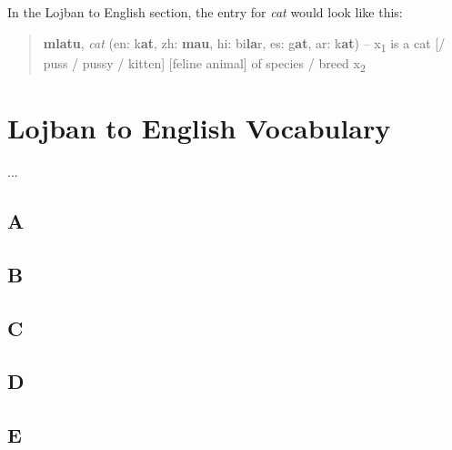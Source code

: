 \documentclass[12pt]{book}
\begin{document}
In the Lojban to English section, the entry for \emph{cat} would look like this:


\begin{quote}
\textbf{mlatu}, \textit{cat} (en: k\textbf{at}, zh: \textbf{mau}, hi: bi\textbf{la}r, es: g\textbf{at}, ar: k\textbf{at}) -- x\textsubscript{1} is a cat [/ puss / pussy / kitten] [feline animal] of species / breed x\textsubscript{2}
\end{quote}


\section{Lojban to English Vocabulary}

...

\subsection{A}

\begin{description}
\item[ ]
\end{description}

\subsection{B}

\begin{description}
\item[ ]
\end{description}

\subsection{C}

\begin{description}
\item[ ]
\end{description}

\subsection{D}

\begin{description}
\item[ ]
\end{description}

\subsection{E}
\end{document}
